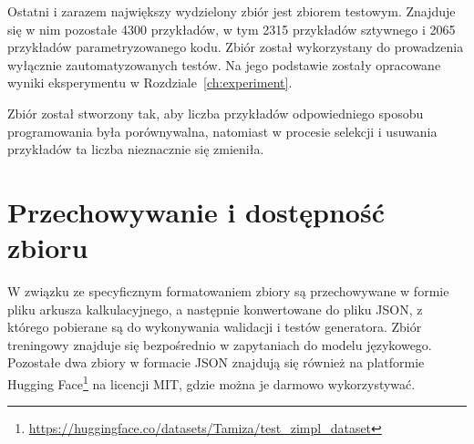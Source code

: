 Ostatni i zarazem największy wydzielony zbiór jest zbiorem testowym. Znajduje się w nim pozostałe 4300 przykładów, w tym 2315 przykładów sztywnego i 2065 przykładów parametryzowanego kodu. Zbiór został wykorzystany do prowadzenia wyłącznie zautomatyzowanych testów. Na jego podstawie zostały opracowane wyniki eksperymentu w Rozdziale~\ref{ch:experiment}.

Zbiór został stworzony tak, aby liczba przykładów odpowiedniego sposobu programowania była porównywalna, natomiast w procesie selekcji i usuwania przykładów ta liczba nieznacznie się zmieniła.

\section{Przechowywanie i dostępność zbioru}

W związku ze specyficznym formatowaniem zbiory są przechowywane w formie pliku arkusza kalkulacyjnego, a następnie konwertowane do pliku JSON, z którego pobierane są do wykonywania walidacji i testów generatora. Zbiór treningowy znajduje się bezpośrednio w zapytaniach do modelu językowego. Pozostałe dwa zbiory w formacie JSON znajdują się również na platformie Hugging Face\footnote{\label{fn:dataset:link}\url{https://huggingface.co/datasets/Tamiza/test_zimpl_dataset}} na licencji MIT, gdzie można je darmowo wykorzystywać.